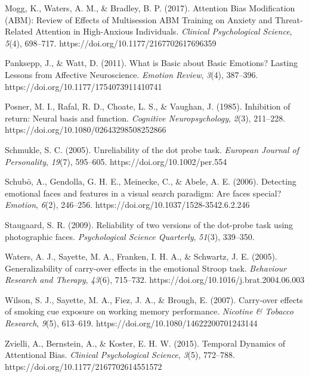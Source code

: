 \documentclass{article}
\begin{document}
	Mogg, K., Waters, A. M., \& Bradley, B. P. (2017). Attention Bias Modification (ABM): Review of Effects of Multisession ABM Training on Anxiety and Threat-Related Attention in High-Anxious Individuals. \emph{Clinical Psychological Science}, \emph{5}(4), 698--717. https://doi.org/10.1177/2167702617696359



	Panksepp, J., \& Watt, D. (2011). What is Basic about Basic Emotions? Lasting Lessons from Affective Neuroscience. \emph{Emotion Review}, \emph{3}(4), 387--396. https://doi.org/10.1177/1754073911410741



	Posner, M. I., Rafal, R. D., Choate, L. S., \& Vaughan, J. (1985). Inhibition of return: Neural basis and function. \emph{Cognitive Neuropsychology}, \emph{2}(3), 211--228. https://doi.org/10.1080/02643298508252866



	Schmukle, S. C. (2005). Unreliability of the dot probe task. \emph{European Journal of Personality}, \emph{19}(7), 595--605. https://doi.org/10.1002/per.554



	Schubö, A., Gendolla, G. H. E., Meinecke, C., \& Abele, A. E. (2006). Detecting emotional faces and features in a visual search paradigm: Are faces special? \emph{Emotion}, \emph{6}(2), 246--256. https://doi.org/10.1037/1528-3542.6.2.246



	Staugaard, S. R. (2009). Reliability of two versions of the dot-probe task using photographic faces. \emph{Psychological Science Quarterly}, \emph{51}(3), 339--350.



	Waters, A. J., Sayette, M. A., Franken, I. H. A., \& Schwartz, J. E. (2005). Generalizability of carry-over effects in the emotional Stroop task. \emph{Behaviour Research and Therapy}, \emph{43}(6), 715--732. https://doi.org/10.1016/j.brat.2004.06.003



	Wilson, S. J., Sayette, M. A., Fiez, J. A., \& Brough, E. (2007). Carry-over effects of smoking cue exposure on working memory performance. \emph{Nicotine \& Tobacco Research}, \emph{9}(5), 613--619. https://doi.org/10.1080/14622200701243144



	Zvielli, A., Bernstein, A., \& Koster, E. H. W. (2015). Temporal Dynamics of Attentional Bias. \emph{Clinical Psychological Science}, \emph{3}(5), 772--788. https://doi.org/10.1177/2167702614551572
\end{document}
